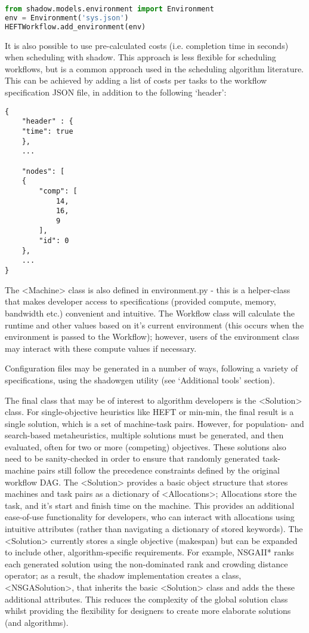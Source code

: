 \documentclass{article}
\begin{document}
\begin{multicols}{2}
\begin{lstlisting}[language=Python]
from shadow.models.environment import Environment
env = Environment('sys.json')
HEFTWorkflow.add_environment(env)
\end{lstlisting}

It is also possible to use pre-calculated costs (i.e. completion time in seconds) when scheduling with shadow. This approach is less flexible for scheduling workflows, but is a common approach used in the scheduling algorithm literature. This can be achieved by adding a list of costs per tasks to the workflow specification JSON file, in addition to the following ‘header’:

\begin{verbatim}
{
    "header" : {
    "time": true
    },
    ...

    "nodes": [
    {
        "comp": [
            14,
            16,
            9
        ],
        "id": 0
    },
    ...
}
\end{verbatim}

The <Machine> class is also defined in environment.py - this is a helper-class that makes developer access to specifications (provided compute, memory, bandwidth etc.) convenient and intuitive. The Workflow class will calculate the runtime and other values based on it’s current environment (this occurs when the environment is passed to the Workflow); however, users of the environment class may interact with these compute values if necessary. 



Configuration files may be generated in a number of ways, following a variety of specifications, using the shadowgen utility (see ‘Additional tools’ section). 

The final class that may be of interest to algorithm developers is the <Solution> class. For single-objective heuristics like HEFT or min-min, the final result is a single solution, which is a set of machine-task pairs. However, for population- and search-based metaheuristics, multiple solutions must be generated, and then evaluated, often for two or more (competing) objectives. These solutions also need to be sanity-checked in order to ensure that randomly generated task-machine pairs still follow the precedence constraints defined by the original workflow DAG. The <Solution> provides a basic object structure that stores machines and task pairs as a dictionary of <Allocations>; Allocations store the task, and it’s start and finish time on the machine. This provides an additional ease-of-use functionality for developers, who can interact with allocations using intuitive attributes (rather than navigating a dictionary of stored keywords). The <Solution> currently stores a single objective (makespan) but can be expanded to include other, algorithm-specific requirements. For example, NSGAII* ranks each generated solution using the non-dominated rank and crowding distance operator; as a result, the shadow implementation creates a class, <NSGASolution>, that inherits the basic <Solution> class and adds the these additional attributes. This reduces the complexity of the global solution class whilst providing the flexibility for designers to create more elaborate solutions (and algorithms). 


\end{multicols}
\end{document}
